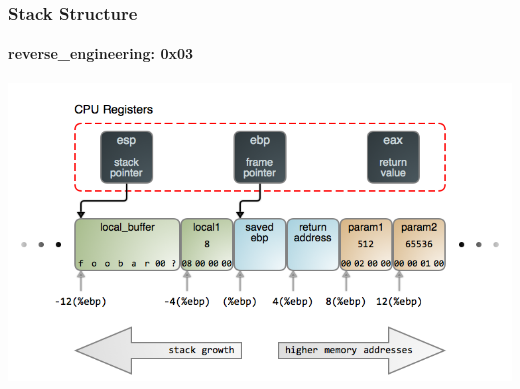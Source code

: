 \documentclass[aspectratio=169]{beamer}
\begin{document}
\begin{frame}
  \frametitle{Stack Structure}
  \framesubtitle{reverse\_engineering: 0x03}
  \begin{center}
    \includegraphics[scale=0.42]{the-stack}
  \end{center}
\end{frame}
\end{document}
